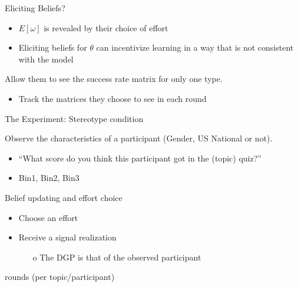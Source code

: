 \documentclass[aspectratio=169]{beamer}
\begin{document}

\begin{frame}{Eliciting Beliefs?}
\begin{itemize}
    \item $E[\omega]$ is revealed by their choice of effort\\
    \bigskip
    \item Eliciting beliefs for $\theta$ can incentivize learning in a way that is not consistent with the model\\
    \bigskip
\end{itemize}

Allow them to see the success rate matrix for only one type. 
\begin{itemize}
    \item Track the matrices they choose to see in each round
\end{itemize}



\end{frame}

\begin{frame}{The Experiment: Stereotype condition}

Observe the characteristics of a participant (Gender, US National or not). \\
\begin{itemize}
    \item ``What score do you think this participant got in the (topic) quiz?'' \\
    \item Bin1, Bin2, Bin3 \\
\end{itemize}
\bigskip
Belief updating and effort choice\\

\begin{itemize}
    \item Choose an effort
    \item Receive a signal realization
    \begin{itemize}
        \item[o] The DGP is that of the observed participant
    \end{itemize}
\end{itemize}
 rounds (per topic/participant)


\end{frame}
\end{document}
\end{frame}
\end{document}
\end{frame}
\end{document}
